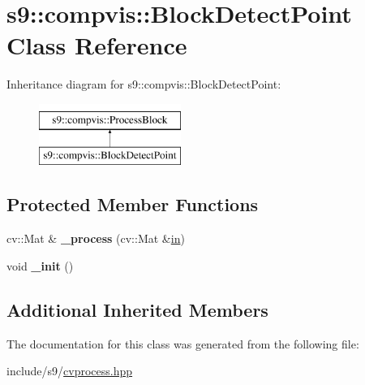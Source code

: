 \hypertarget{classs9_1_1compvis_1_1BlockDetectPoint}{\section{s9\-:\-:compvis\-:\-:Block\-Detect\-Point Class Reference}
\label{classs9_1_1compvis_1_1BlockDetectPoint}
}
Inheritance diagram for s9\-:\-:compvis\-:\-:Block\-Detect\-Point\-:\begin{figure}[H]
\begin{center}
\leavevmode
\includegraphics[height=2.000000cm]{classs9_1_1compvis_1_1BlockDetectPoint}
\end{center}
\end{figure}
\subsection*{Protected Member Functions}
\begin{DoxyCompactItemize}
\item 
\hypertarget{classs9_1_1compvis_1_1BlockDetectPoint_ab7006a8233569879bf998aa4e0d0c540}{cv\-::\-Mat \& {\bfseries \-\_\-process} (cv\-::\-Mat \&\hyperlink{structin}{in})}\label{classs9_1_1compvis_1_1BlockDetectPoint_ab7006a8233569879bf998aa4e0d0c540}

\item 
\hypertarget{classs9_1_1compvis_1_1BlockDetectPoint_a5194bc6948d4efe3679a236e7a651a60}{void {\bfseries \-\_\-init} ()}\label{classs9_1_1compvis_1_1BlockDetectPoint_a5194bc6948d4efe3679a236e7a651a60}

\end{DoxyCompactItemize}
\subsection*{Additional Inherited Members}


The documentation for this class was generated from the following file\-:\begin{DoxyCompactItemize}
\item 
include/s9/\hyperlink{cvprocess_8hpp}{cvprocess.\-hpp}\end{DoxyCompactItemize}
